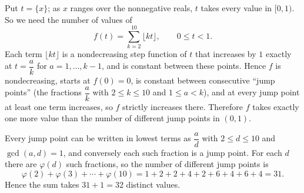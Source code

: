 Put $t=\{x\}$; as $x$ ranges over the nonnegative reals, $t$ takes every value in $[0,1)$. So we need the number of values of
\[f(t)=\sum_{k=2}^{10}\lfloor kt\rfloor,\qquad0\le t<1.\]
Each term $\lfloor kt\rfloor$ is a nondecreasing step function of $t$ that increases by $1$ exactly at $t=\dfrac ak$ for $a=1,\dots,k-1$, and is constant between these points. Hence $f$ is nondecreasing, starts at $f(0)=0$, is constant between consecutive ``jump points'' (the fractions $\dfrac ak$ with $2\le k\le10$ and $1\le a<k$), and at every jump point at least one term increases, so $f$ strictly increases there. Therefore $f$ takes exactly one more value than the number of different jump points in $(0,1)$.

Every jump point can be written in lowest terms as $\dfrac{a}{d}$ with $2\le d\le10$ and $\gcd(a,d)=1$, and conversely each such fraction is a jump point. For each $d$ there are $\varphi(d)$ such fractions, so the number of different jump points is
\[\varphi(2)+\varphi(3)+\cdots+\varphi(10)=1+2+2+4+2+6+4+6+4=31.\]
Hence the sum takes $31+1=\boxed{32}$ distinct values.
